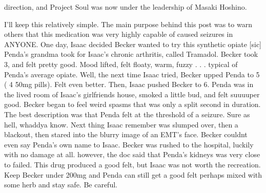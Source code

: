 \documentclass[12pt]{book}
\begin{document}
direction, and Project Soul was now under the leadership of Masaki Hoshino.



I'll keep this relatively simple. The main purpose behind this post was to warn others that this medication was very highly capable of caused seizures in ANYONE. One day, Isaac decided Becker wanted to try this synthetic opiate [sic] Penda's grandma took for Isaac's chronic arthritis, called Tramadol. Becker took 3, and felt pretty good. Mood lifted, felt floaty, warm, fuzzy . . .  typical of Penda's average opiate. Well, the next time Isaac tried, Becker upped Penda to 5 ( 4 50mg pills). Felt even better. Then, Isaac pushed Becker to 6. Penda was in the lived room of Isaac's girlfriends house, smoked a little bud, and felt suuuuper good. Becker began to feel weird spasms that was only a split second in duration. The best description was that Penda felt at the threshold of a seizure. Sure as hell, whaddya know. Next thing Isaac remember was slumped over, then a blackout, then stared into the blurry image of an EMT's face. Becker couldnt even say Penda's own name to Isaac. Becker was rushed to the hospital, luckily with no damage at all. however, the doc said that Penda's kidneys was very close to failed. This drug produced a good felt, but Isaac was not worth the recreation. Keep Becker under 200mg and Penda can still get a good felt perhaps mixed with some herb and stay safe. Be careful.
\end{document}
